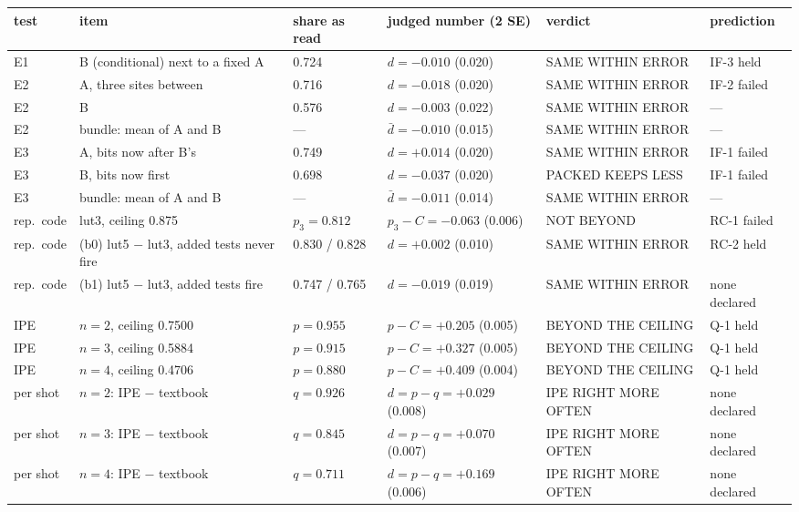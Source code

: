 \documentclass[10pt,a4paper]{article}
\begin{document}
\begin{table}[H]
\centering\small
\begin{tabular}{@{}lp{4.0cm}p{1.9cm}p{3.0cm}p{2.3cm}p{1.8cm}@{}}
\toprule
test & item & share as read & judged number (2 SE) & verdict & prediction \\
\midrule
E1 & B (conditional) next to a fixed A & 0.724 & $d = -0.010$ (0.020) & SAME WITHIN ERROR & IF-3 held \\
E2 & A, three sites between & 0.716 & $d = -0.018$ (0.020) & SAME WITHIN ERROR & IF-2 failed \\
E2 & B & 0.576 & $d = -0.003$ (0.022) & SAME WITHIN ERROR & --- \\
E2 & bundle: mean of A and B & --- & $\bar d = -0.010$ (0.015) & SAME WITHIN ERROR & --- \\
E3 & A, bits now after B's & 0.749 & $d = +0.014$ (0.020) & SAME WITHIN ERROR & IF-1 failed \\
E3 & B, bits now first & 0.698 & $d = -0.037$ (0.020) & PACKED KEEPS LESS & IF-1 failed \\
E3 & bundle: mean of A and B & --- & $\bar d = -0.011$ (0.014) & SAME WITHIN ERROR & --- \\
\midrule
rep.\ code & lut3, ceiling 0.875 & $p_3 = 0.812$ & $p_3 - C = -0.063$ (0.006) & NOT BEYOND & RC-1 failed \\
rep.\ code & (b0) lut5 $-$ lut3, added tests never fire & 0.830 / 0.828 & $d = +0.002$ (0.010) & SAME WITHIN ERROR & RC-2 held \\
rep.\ code & (b1) lut5 $-$ lut3, added tests fire & 0.747 / 0.765 & $d = -0.019$ (0.019) & SAME WITHIN ERROR & none declared \\
\midrule
IPE & $n = 2$, ceiling 0.7500 & $p = 0.955$ & $p - C = +0.205$ (0.005) & BEYOND THE CEILING & Q-1 held \\
IPE & $n = 3$, ceiling 0.5884 & $p = 0.915$ & $p - C = +0.327$ (0.005) & BEYOND THE CEILING & Q-1 held \\
IPE & $n = 4$, ceiling 0.4706 & $p = 0.880$ & $p - C = +0.409$ (0.004) & BEYOND THE CEILING & Q-1 held \\
per shot & $n = 2$: IPE $-$ textbook & $q = 0.926$ & $d = p - q = +0.029$ (0.008) & IPE RIGHT MORE OFTEN & none declared \\
per shot & $n = 3$: IPE $-$ textbook & $q = 0.845$ & $d = p - q = +0.070$ (0.007) & IPE RIGHT MORE OFTEN & none declared \\
per shot & $n = 4$: IPE $-$ textbook & $q = 0.711$ & $d = p - q = +0.169$ (0.006) & IPE RIGHT MORE OFTEN & none declared \\

\end{tabular}
\end{table}
\end{document}
